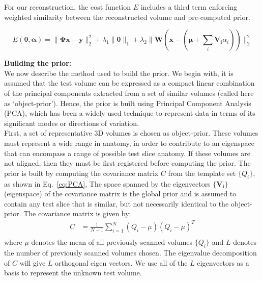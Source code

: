 \documentclass{article}
\begin{document}
For our reconstruction, the cost function $E$ includes a third term enforcing weighted similarity between the reconstructed volume and pre-computed prior.

\begin{equation}
  E(\boldsymbol{\theta},\boldsymbol{\alpha}) = \lVert\boldsymbol{\Phi x- y}\rVert_2^2  + \lambda_1\lVert\boldsymbol{\theta}\rVert_1 +\lambda_2\lVert\boldsymbol{W}(\boldsymbol{x} - (\boldsymbol{\mu} + \sum_{i}\boldsymbol{V_i}\alpha_i))\rVert_2^2
\label{eq:weighted_prior}
\end{equation}
\newpage



\textbf{Building the prior:}\\

We now describe the method used to build the prior. We begin with, it is assumed that the test volume can be expressed as a compact linear combination of the principal components extracted from a set of similar volumes (called here as `object-prior'). Hence, the prior is built using Principal Component Analysis (PCA), which has been a widely used technique to represent data in terms of its significant modes or directions of variation. \\

First, a set of representative 3D volumes is chosen as object-prior. These volumes must represent a wide range in anatomy, in order to contribute to an eigenspace that can encompass a range of possible test slice anatomy. If these volumes are not aligned, then they must be first registered before computing the prior. The prior is built by computing the covariance matrix $C$ from the template set $\{Q_i\}$, as shown in Eq.~\ref{eq:PCA}, The space spanned by the eigenvectors $\boldsymbol{\{V_i\}}$ (eigenspace) of the covariance matrix is the global prior and is assumed to contain any test slice that is similar, but not necessarily identical to the object-prior. The covariance matrix is given by:
 \begin{equation}
\begin{split}
  C  & = \frac{1}{N-1}\sum_{i=1}^N(Q_i - \mu)(Q_i - \mu)^{T}\\
\end{split}
\label{eq:PCA}
\end{equation}
where $\mu$ denotes the mean of all previously scanned volumes $\{Q_i\}$ and $L$ denotes the number of previously scanned volumes chosen. The eigenvalue decomposition of $C$ will give $L$ orthogonal eigen vectors. We use all of the $L$ eigenvectors as a basis to represent the unknown test volume.  \\
\end{document}
